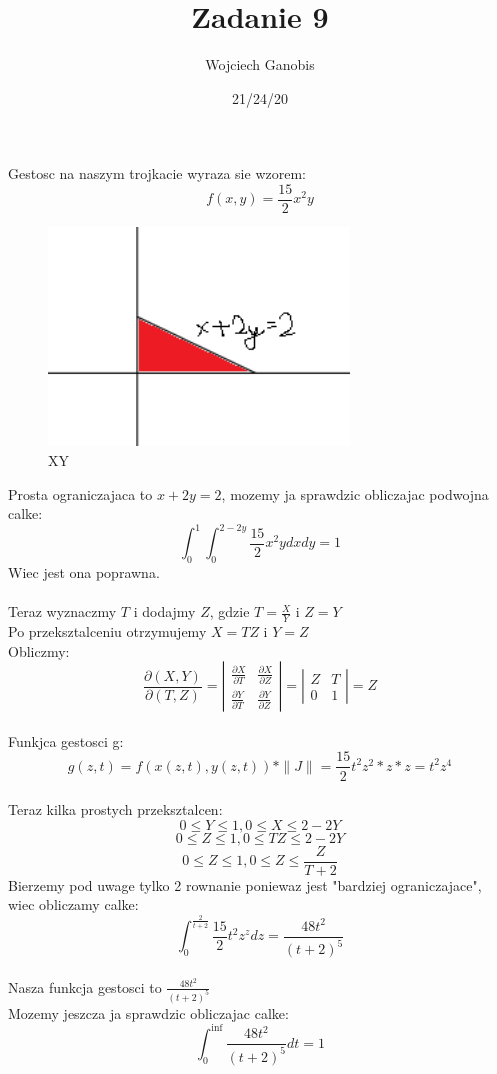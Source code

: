 \documentclass[12pt]{article}
\title{Zadanie 9}
\author{Wojciech Ganobis}
\date{21/24/20}
\begin{document}
Gestosc na naszym trojkacie wyraza sie wzorem:
$$f(x,y) = \frac{15}2 x^{2}y$$

\begin{figure}[h]
	\centering
   
		\includegraphics[width=8cm]{r1}
		\caption{XY}
\end{figure}
Prosta ograniczajaca to $x + 2y = 2$, mozemy ja sprawdzic obliczajac podwojna calke:
$$\int^{1}_{0}\int^{2-2y}_{0}\frac{15}2 x^{2}y dxdy = 1$$
Wiec jest ona poprawna.\\\\
Teraz wyznaczmy $T$ i dodajmy $Z$, gdzie $T = \frac{X}Y$ i $Z = Y$\\
Po przeksztalceniu otrzymujemy $X = TZ$ i $Y = Z$\\
Obliczmy:
$$\frac{\partial (X,Y)}{\partial (T,Z)} = \left|\begin{array}{cc}
\frac{\partial X}{\partial T} & \frac{\partial X}{\partial Z} \\
\frac{\partial Y}{\partial T} & \frac{\partial Y}{\partial Z}
\end{array}\right| = \left|\begin{array}{cc}
Z &T \\
0 & 1
\end{array}\right| = Z$$\\
Funkjca gestosci g:
$$g(z,t) = f(x(z,t), y(z,t)) * \|J\| = \frac{15}2 t^{2}z^{2} * z * z = t^{2}z^{4}$$\\
Teraz kilka prostych przeksztalcen:\\
$$0 \leq Y \leq 1,    0 \leq X \leq 2-2Y$$
$$0 \leq Z \leq 1,    0 \leq TZ \leq 2-2Y$$
$$0 \leq Z \leq 1,    0 \leq Z \leq \frac{Z}{T+2}$$
Bierzemy pod uwage tylko 2 rownanie poniewaz jest "bardziej ograniczajace", wiec obliczamy calke:
$$\int^{\frac{2}{t+2}}_{0}\frac{15}2 t^{2}z^{z}dz = \frac{48t^{2}}{(t+2)^5}$$\\
Nasza funkcja gestosci to $\frac{48t^{2}}{(t+2)^5}$\\
Mozemy jeszcza ja sprawdzic obliczajac calke:
$$\int^{\inf}_{0}\frac{48t^{2}}{(t+2)^5}dt = 1$$
 
\end{document}
